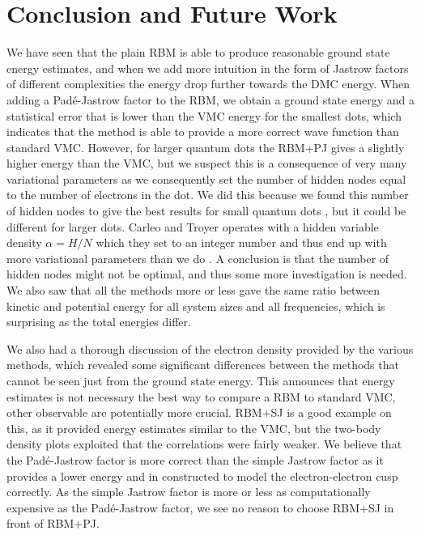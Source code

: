 \chapter{Conclusion and Future Work} \label{sec:conclusion}
We have seen that the plain RBM is able to produce reasonable ground state energy estimates, and when we add more intuition in the form of Jastrow factors of different complexities the energy drop further towards the DMC energy. When adding a Padé-Jastrow factor to the RBM, we obtain a ground state energy and a statistical error that is lower than the VMC energy for the smallest dots, which indicates that the method is able to provide a more correct wave function than standard VMC. However, for larger quantum dots the RBM+PJ gives a slightly higher energy than the VMC, but we suspect this is a consequence of very many variational parameters as we consequently set the number of hidden nodes equal to the number of electrons in the dot. We did this because we found this number of hidden nodes to give the best results for small quantum dots \cite{nordhagen_computational_2018}, but it could be different for larger dots. Carleo and Troyer operates with a hidden variable density $\alpha=H/N$ which they set to an integer number and thus end up with more variational parameters than we do \cite{carleo_solving_2017}. A conclusion is that the number of hidden nodes might not be optimal, and thus some more investigation is needed. We also saw that all the methods more or less gave the same ratio between kinetic and potential energy for all system sizes and all frequencies, which is surprising as the total energies differ.

We also had a thorough discussion of the electron density provided by the various methods, which revealed some significant differences between the methods that cannot be seen just from the ground state energy. This announces that energy estimates is not necessary the best way to compare a RBM to standard VMC, other observable are potentially more crucial. RBM+SJ is a good example on this, as it provided energy estimates similar to the VMC, but the two-body density plots exploited that the correlations were fairly weaker. We believe that the Padé-Jastrow factor is more correct than the simple Jastrow factor as it provides a lower energy and in constructed to model the electron-electron cusp correctly. As the simple Jastrow factor is more or less as computationally expensive as the Padé-Jastrow factor, we see no reason to choose RBM+SJ in front of RBM+PJ. 

